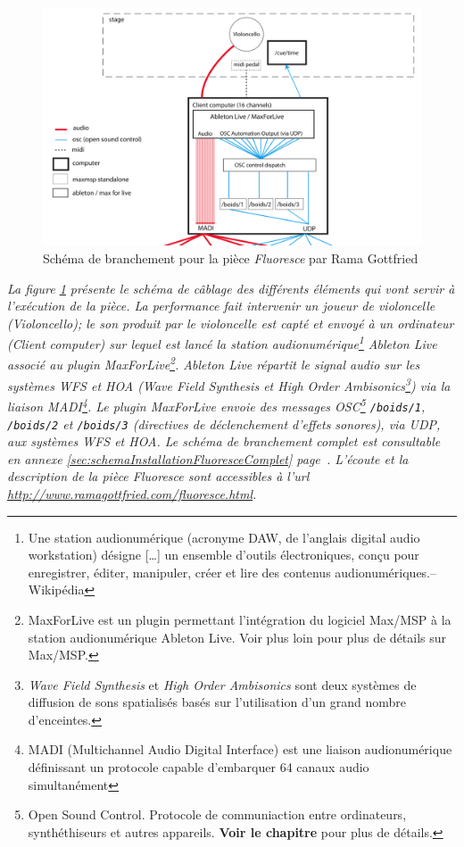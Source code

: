 \begin{figure}[H]
	\centering
	\includegraphics[keepaspectratio=true, width=\textwidth]{Notation/i/schemaInstallationFluoresce.png}
	\caption[Schéma de branchement pour la pièce \textit{Fluoresce} par Rama Gottfried]{Schéma de branchement pour la pièce \textit{Fluoresce} par Rama Gottfried}
	\label{fig:schemaInstallationFluoresce}			
\end{figure}
\begin{center}
\small \it La figure \ref{fig:schemaInstallationFluoresce} présente le schéma de câblage des différents éléments qui vont servir à l'exécution de la pièce. La performance fait intervenir un joueur de violoncelle (\textit{Violoncello}); le son produit par le violoncelle est capté et envoyé à un ordinateur (\textit{Client computer}) sur lequel est lancé la station audionumérique\footnote{\og Une station audionumérique (acronyme DAW, de l'anglais digital audio workstation) désigne […] un ensemble d'outils électroniques, conçu pour enregistrer, éditer, manipuler, créer et lire des contenus audionumériques.\fg -- Wikipédia} \textit{Ableton Live} associé au plugin \textit{MaxForLive}\footnote{MaxForLive est un plugin permettant l'intégration du logiciel Max/MSP à la station audionumérique Ableton Live. Voir plus loin pour plus de détails sur Max/MSP.}. Ableton Live répartit le signal audio sur les systèmes WFS et HOA (\textit{Wave Field Synthesis} et \textit{High Order Ambisonics}\footnote{\textit{Wave Field Synthesis} et \textit{High Order Ambisonics} sont deux systèmes de diffusion de sons spatialisés basés sur l'utilisation d'un grand nombre d'enceintes.}) via la liaison MADI\footnote{MADI (Multichannel Audio Digital Interface) est une liaison audionumérique définissant un protocole capable d'embarquer 64 canaux audio simultanément}. Le plugin MaxForLive envoie des messages OSC\footnote{Open Sound Control. Protocole de communiaction entre ordinateurs, synthéthiseurs et autres appareils. \textbf{Voir le chapitre} pour plus de détails.} \texttt{/boids/1}, \texttt{/boids/2} et \texttt{/boids/3} (directives de déclenchement d'effets sonores), via UDP, aux systèmes WFS et HOA. Le schéma de branchement complet est consultable en annexe \ref{sec:schemaInstallationFluoresceComplet} page~\pageref{sec:schemaInstallationFluoresceComplet}. L'écoute et la description de la pièce \textit{Fluoresce} sont accessibles à l'url \url{http://www.ramagottfried.com/fluoresce.html}.
\end{center}

